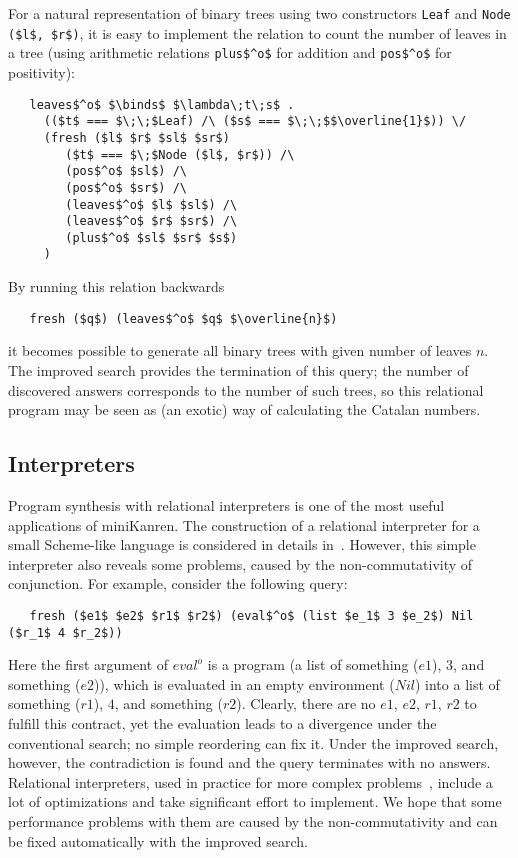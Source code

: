 For a natural representation of binary trees using two constructors \lstinline|Leaf| and 
\lstinline|Node ($l$, $r$)|, it is easy to implement the relation to count the number of 
leaves in a tree (using arithmetic relations \lstinline|plus$^o$| for addition and \lstinline|pos$^o$|
for positivity):

\begin{lstlisting}
   leaves$^o$ $\binds$ $\lambda\;t\;s$ .
     (($t$ === $\;\;$Leaf) /\ ($s$ === $\;\;$$\overline{1}$)) \/
     (fresh ($l$ $r$ $sl$ $sr$)
        ($t$ === $\;$Node ($l$, $r$)) /\
        (pos$^o$ $sl$) /\
        (pos$^o$ $sr$) /\
        (leaves$^o$ $l$ $sl$) /\
        (leaves$^o$ $r$ $sr$) /\
        (plus$^o$ $sl$ $sr$ $s$)
     )
\end{lstlisting}

By running this relation backwards

\begin{lstlisting}
   fresh ($q$) (leaves$^o$ $q$ $\overline{n}$)
\end{lstlisting}

\noindent it becomes possible to generate all binary trees with given number of leaves $n$. 
The improved search provides the termination of this query; the number of discovered 
answers corresponds to the number of such trees, so this relational program may be seen 
as (an exotic) way of calculating the Catalan numbers.

\subsection{Interpreters}

Program synthesis with relational interpreters is one of the most useful applications of miniKanren. 
The construction of a relational interpreter for a small Scheme-like language is considered 
in details in~\cite{Untagged}. However, this simple interpreter also reveals some problems, caused by 
the non-commutativity of conjunction. For example, consider the following query:

\begin{lstlisting}
   fresh ($e1$ $e2$ $r1$ $r2$) (eval$^o$ (list $e_1$ 3 $e_2$) Nil ($r_1$ 4 $r_2$))
\end{lstlisting}

Here the first argument of $eval^o$ is a program (a list of something ($e1$), $3$, and something ($e2$)),
which is evaluated in an empty environment ($Nil$) into a list of  something ($r1$), $4$, and something ($r2$).
Clearly, there are no $e1$, $e2$, $r1$, $r2$ to fulfill this contract, yet the evaluation leads to a divergence
under the conventional search; no simple reordering can fix it. Under the improved search, however, the
contradiction is found and the query terminates with no answers. Relational interpreters, used in practice for
more complex problems~\cite{unified}, include a lot of optimizations and take significant effort to implement.
We hope that some performance problems with them are caused by the non-commutativity and can be fixed automatically 
with the improved search.

